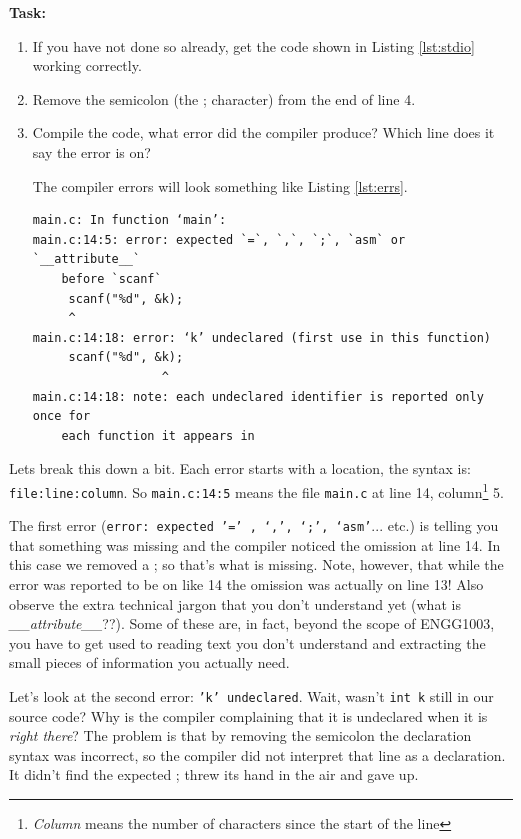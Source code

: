 \documentclass{lab}
\begin{document}
\textbf{Task:}
\begin{enumerate}
	\item If you have not done so already, get the code shown in Listing \ref{lst:stdio} working correctly.
	\item Remove the semicolon (the ; character) from the end of line 4.
	\item Compile the code, what error did the compiler produce? Which line does it say the error is on?
	
	The compiler errors will look something like Listing \ref{lst:errs}.
	
	\begin{lstlisting}[caption=The multiple errors produced by removing a \textit{single} semicolon.,label=lst:errs,basicstyle=\ttfamily,frame=single]
main.c: In function ‘main’:
main.c:14:5: error: expected `=`, `,`, `;`, `asm` or `__attribute__`
	before `scanf`
     scanf("%d", &k);
     ^
main.c:14:18: error: ‘k’ undeclared (first use in this function)
     scanf("%d", &k);
                  ^
main.c:14:18: note: each undeclared identifier is reported only once for
	each function it appears in
	\end{lstlisting}
\end{enumerate}
	
Lets break this down a bit. Each error starts with a location, the syntax is: \texttt{{file}:{line}:{column}}. So \texttt{main.c:14:5} means the file \texttt{main.c} at line 14, column\footnote{\textit{Column} means the number of characters since the start of the line} 5.

The first error (\texttt{error: expected '=' , ‘,’, ‘;’, ‘asm'}... etc.) is telling you that something was missing and the compiler noticed the omission at line 14. In this case we removed a ; so that's what is missing. Note, however, that while the error was reported to be on like 14 the omission was actually on line 13! Also observe the extra technical jargon that you don't understand yet (what is \textit{\_\_attribute\_\_}??). Some of these are, in fact, beyond the scope of ENGG1003, you have to get used to reading text you don't understand and extracting the small pieces of information you actually need.

Let's look at the second error: \texttt{'k' undeclared}. Wait, wasn't \texttt{int k} still in our source code? Why is the compiler complaining that it is undeclared when it is \textit{right there}? The problem is that by removing the semicolon the declaration syntax was incorrect, so the compiler did not interpret that line as a declaration. It didn't find the expected ; threw its hand in the air and gave up.
\end{document}
